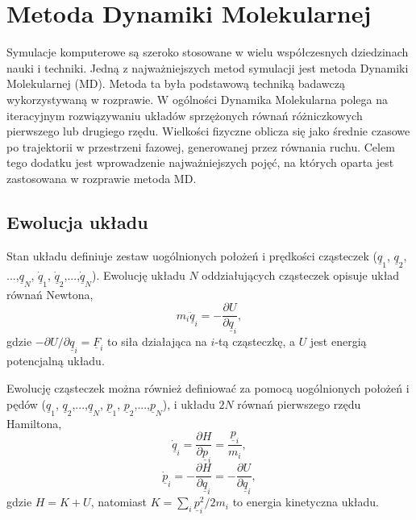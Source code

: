 \documentclass[12pt,a4paper,openright]{report} %
\begin{document}
\chapter{Metoda Dynamiki Molekularnej}
\label{dodatekA}
\begin{samepage}
Symulacje komputerowe są szeroko stosowane w wielu współczesnych dziedzinach nauki i techniki. Jedną z najważniejszych metod symulacji jest metoda Dynamiki Molekularnej (MD). Metoda ta była podstawową techniką badawczą wykorzystywaną w rozprawie. 
W ogólności Dynamika Molekularna polega na iteracyjnym rozwiązywaniu układów sprzężonych równań różniczkowych pierwszego lub drugiego rzędu. Wielkości fizyczne oblicza się jako średnie czasowe po trajektorii w przestrzeni fazowej, generowanej przez równania ruchu. Celem tego dodatku jest wprowadzenie najważniejszych pojęć, na których oparta jest zastosowana w rozprawie metoda MD.
\section{Ewolucja układu}
Stan układu definiuje zestaw uogólnionych położeń i prędkości cząsteczek ($\underline{q}_1$, $\underline{q}_2$,$...$,$\underline{q}_N$, $\underline{\dot{q}}_1$, $\underline{\dot{q}}_2$,$...$,$\underline{\dot{q}}_N$). Ewolucję układu $N$ oddziałujących cząsteczek opisuje układ równań Newtona,
\begin{equation}
m_i \underline{\ddot{q}}_i=-\frac{\partial U}{\partial \underline{q}_i},
\label{rownania_newtona}
\end{equation}
gdzie $-{\partial U}/{\partial \underline{q}_i} = \underline{F}_i$ to siła działająca na $i$-tą cząsteczkę, a $U$ jest energią potencjalną układu.
\end{samepage}
%
\newpage
\noindent
%
\begin{samepage}
Ewolucję cząsteczek można również definiować za pomocą uogólnionych położeń i pędów ($\underline{q}_1$, $\underline{q}_2$,$...$,$\underline{q}_N$, $\underline{p}_1$, $\underline{p}_2$,$...$,$\underline{p}_N$), i układu $2 N$ równań pierwszego rzędu Hamiltona, 
\begin{equation}
\dot{\underline{q}}_i = \frac{\partial H}{\partial \underline{p}_i} = \frac{\underline{p}_i}{m_i},
\label{eq:RownHam3}
\end{equation}
\begin{equation}
\dot{\underline{p}}_i=-\frac{\partial H}{\partial \underline{q}_i} = -\frac{\partial U}{\partial \underline{q}_i},
\label{eq:RownHam4}
\end{equation}
gdzie $H=K+U$, natomiast $K=\sum_i \underline{p}^2_i/2m_i$ to energia kinetyczna układu.
\end{samepage}
\end{document}
